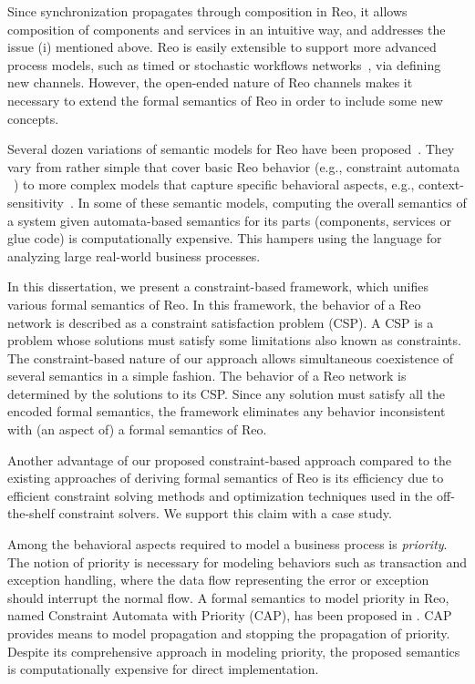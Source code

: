 Since synchronization propagates through composition in Reo, it allows composition of components and services in an intuitive way, and addresses the issue (i) mentioned above. %
Reo is easily extensible to support more advanced process models, such as timed \cite{resMengA07} or stochastic workflows networks~\cite{yjmfolks}, via defining new channels. 
However, the open-ended nature of Reo channels makes it necessary to extend the formal semantics of Reo in order to include some new concepts. 

Several dozen variations of semantic models for Reo have been proposed~\cite{sung30semantics}. They vary from rather simple that cover basic Reo behavior (e.g., constraint automata ~\cite{BaierCA}) to more complex models that capture specific behavioral aspects, e.g., context-sensitivity~\cite{coloring}. In some of these semantic models, computing the overall semantics of a system given automata-based semantics for its parts (components, services or glue code) is computationally expensive. This hampers using the language for analyzing large real-world business processes. 

In this dissertation, we present a constraint-based framework, which unifies various formal semantics of Reo. In this framework, the behavior of a Reo network is described as a constraint satisfaction problem (CSP). A CSP is a problem whose solutions must satisfy some limitations also known as constraints. The constraint-based nature of our approach allows simultaneous coexistence of several semantics in a simple fashion. The behavior of a Reo network is determined by the solutions to its CSP. Since any solution must satisfy all the encoded formal semantics, the framework eliminates any behavior inconsistent with (an aspect of) a formal semantics of Reo.


Another advantage of our proposed constraint-based approach compared to the existing approaches of deriving formal semantics of Reo is its efficiency due to efficient constraint solving methods and optimization techniques used in the off-the-shelf constraint solvers. We support this claim with a case study.

Among the behavioral aspects required to model a business process is \emph{priority}. The notion of priority is necessary for modeling behaviors such as transaction and exception handling, where the data flow representing the error or exception should interrupt the normal flow. 
A formal semantics to model priority in Reo, named Constraint Automata with Priority (CAP), has been proposed in \cite{priority}. CAP provides means to model propagation and stopping the propagation of priority. Despite its comprehensive approach in modeling priority, the proposed semantics is computationally expensive for direct implementation. 

